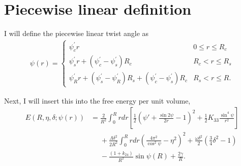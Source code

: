 \documentclass[12pt]{article}
\begin{document}


\section{Piecewise linear definition}
I will define the piecewise linear twist angle as
\begin{align}\label{eq:basicpiecewise}
\psi(r)=
\begin{cases}
	\psi_c^{\prime} r															& 0 \leq r \leq R_c \\
	\psi_s^{\prime} r + (\psi_c^{\prime}-\psi_s^{\prime})R_c								& R_c < r \leq R_s \\
	\psi_R^{\prime}r+(\psi_s^{\prime}-\psi_R^{\prime})R_s+(\psi_c^{\prime}-\psi_s^{\prime})R_c	& R_s < r \leq R.
\end{cases}
\end{align}

Next, I will insert this into the free energy per unit volume,
\begin{align}\label{eq:startE}
E(R,\eta,\delta;\psi(r))&=\frac{2}{R^2}\int_0^{R}rdr\left[\frac{1}{2}\left(\psi'+\frac{\sin2\psi}{2r}-1\right)^2+\frac{1}{2}K_{33}\frac{\sin^4\psi}{r^2}\right]\nonumber\\
&\phantom{=}+\frac{\Lambda\delta^2}{2R^2}\int_0^{R}rdr\left(\frac{4\pi^2}{\cos^2\psi}-\eta^2\right)^2+\frac{\omega\delta^2}{2}\left(\frac{3}{4}\delta^2-1\right)\nonumber\\
&\phantom{=}-\frac{(1+k_{24})}{R^2}\sin\psi(R)+\frac{2\gamma}{R}.
\end{align}
\end{document}
